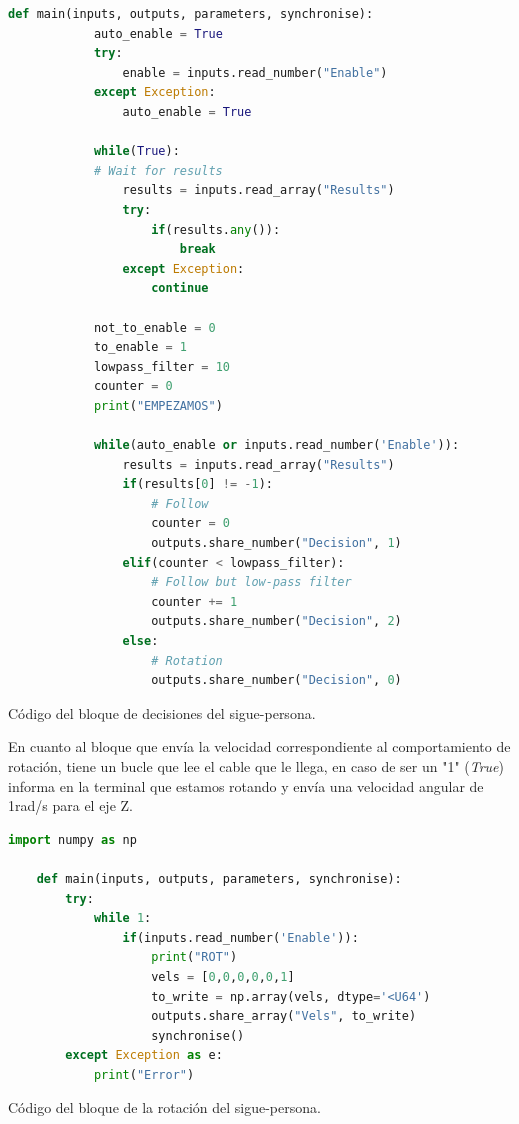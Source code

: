\begin{code}[H]
    \begin{lstlisting}[language=python]
        def main(inputs, outputs, parameters, synchronise):
            auto_enable = True
            try:
                enable = inputs.read_number("Enable")
            except Exception:
                auto_enable = True
             
            while(True):
            # Wait for results
                results = inputs.read_array("Results")
                try:
                    if(results.any()):
                        break
                except Exception:
                    continue
    
            not_to_enable = 0
            to_enable = 1
            lowpass_filter = 10
            counter = 0
            print("EMPEZAMOS")

            while(auto_enable or inputs.read_number('Enable')):
                results = inputs.read_array("Results")
                if(results[0] != -1):
                    # Follow
                    counter = 0
                    outputs.share_number("Decision", 1)
                elif(counter < lowpass_filter):
                    # Follow but low-pass filter
                    counter += 1
                    outputs.share_number("Decision", 2)
                else:
                    # Rotation
                    outputs.share_number("Decision", 0)
    \end{lstlisting}
    \caption[Código bloque decisión sigue-persona]{Código del bloque de decisiones del sigue-persona.}
    \label{cod:decision_follow_person}
\end{code}

En cuanto al bloque que envía la velocidad correspondiente al comportamiento de rotación, tiene un bucle que lee el cable que le llega, en caso de ser un "1" (\textit{True}) informa en la terminal que estamos rotando y envía una velocidad angular de 1rad/s para el eje Z.

\begin{code}[H]
    \begin{lstlisting}[language=python]
    import numpy as np

    def main(inputs, outputs, parameters, synchronise):
        try:
            while 1:
                if(inputs.read_number('Enable')):
                    print("ROT")
                    vels = [0,0,0,0,0,1]
                    to_write = np.array(vels, dtype='<U64')
                    outputs.share_array("Vels", to_write)   
                    synchronise()
        except Exception as e:
            print("Error")
    \end{lstlisting}
    \caption[Código bloque rotación sigue-persona]{Código del bloque de la rotación del sigue-persona.}
    \label{cod:rotation_follow_person}
\end{code}

